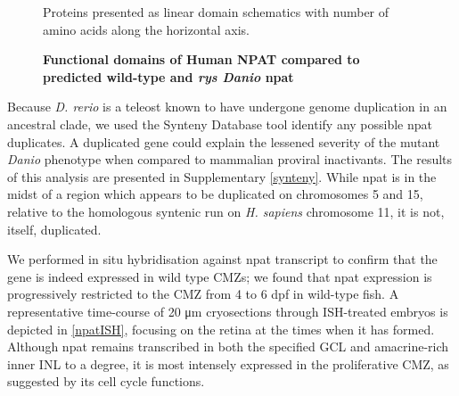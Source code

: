 \documentclass{ut-thesis}
\begin{document}
\begin{NoHyper}
\begin{figure}[!h]
    \caption{{\bf Functional domains of Human NPAT compared to predicted wild-type and \textit{rys Danio} npat}}
    Proteins presented as linear domain schematics with number of amino acids along the horizontal axis.
    \label{npatprotein}
\end{figure}
\FloatBarrier

Because \textit{D. rerio} is a teleost known to have undergone genome duplication in an ancestral clade, we used the Synteny Database tool \cite{Catchen2009} identify any possible npat duplicates. A duplicated gene could explain the lessened severity of the mutant \textit{Danio} phenotype when compared to mammalian proviral inactivants. The results of this analysis are presented in Supplementary \autoref{synteny}. While npat is in the midst of a region which appears to be duplicated on chromosomes 5 and 15, relative to the homologous syntenic run on \textit{H. sapiens} chromosome 11, it is not, itself, duplicated.

We performed in situ hybridisation against npat transcript to confirm that the gene is indeed expressed in wild type CMZs; we found that npat expression is progressively restricted to the CMZ from 4 to 6 dpf in wild-type fish. A representative time-course of 20 \si{\micro\metre} cryosections through ISH-treated embryos is depicted in \autoref{npatISH}, focusing on the retina at the times when it has formed. Although npat remains transcribed in both the specified GCL and amacrine-rich inner INL to a degree, it is most intensely expressed in the proliferative CMZ, as suggested by its cell cycle functions.


\end{NoHyper}
\end{document}
